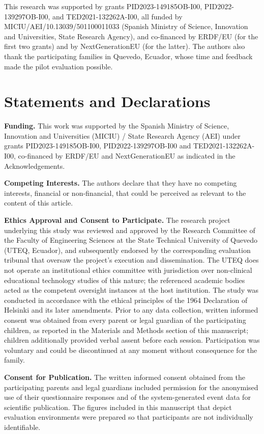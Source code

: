 \documentclass[pdflatex,sn-apa]{sn-jnl}%
\begin{document}
\backmatter

    This research was supported by grants PID2023-149185OB-I00, PID2022-139297OB-I00, and TED2021-132262A-I00, all funded by MICIU/AEI/10.13039/501100011033 (Spanish Ministry of Science, Innovation and Universities, State Research Agency), and co-financed by ERDF/EU (for the first two grants) and by NextGenerationEU (for the latter).
    The authors also thank the participating families in Quevedo, Ecuador, whose time and feedback made the pilot evaluation possible.

\section*{Statements and Declarations}

    \textbf{Funding.}
        This work was supported by the Spanish Ministry of Science, Innovation and Universities (MICIU) / State Research Agency (AEI) under grants PID2023-149185OB-I00, PID2022-139297OB-I00 and TED2021-132262A-I00, co-financed by ERDF/EU and NextGenerationEU as indicated in the Acknowledgements.

    \textbf{Competing Interests.}
        The authors declare that they have no competing interests, financial or non-financial, that could be perceived as relevant to the content of this article.

    \textbf{Ethics Approval and Consent to Participate.}
        The research project underlying this study was reviewed and approved by the Research Committee of the Faculty of Engineering Sciences at the State Technical University of Quevedo (UTEQ, Ecuador), and subsequently endorsed by the corresponding evaluation tribunal that oversaw the project's execution and dissemination. The UTEQ does not operate an institutional ethics committee with jurisdiction over non-clinical educational technology studies of this nature; the referenced academic bodies acted as the competent oversight instances at the host institution. The study was conducted in accordance with the ethical principles of the 1964 Declaration of Helsinki and its later amendments. Prior to any data collection, written informed consent was obtained from every parent or legal guardian of the participating children, as reported in the Materials and Methods section of this manuscript; children additionally provided verbal assent before each session. Participation was voluntary and could be discontinued at any moment without consequence for the family.

    \textbf{Consent for Publication.}
        The written informed consent obtained from the participating parents and legal guardians included permission for the anonymised use of their questionnaire responses and of the system-generated event data for scientific publication. The figures included in this manuscript that depict evaluation environments were prepared so that participants are not individually identifiable.
\end{document}
